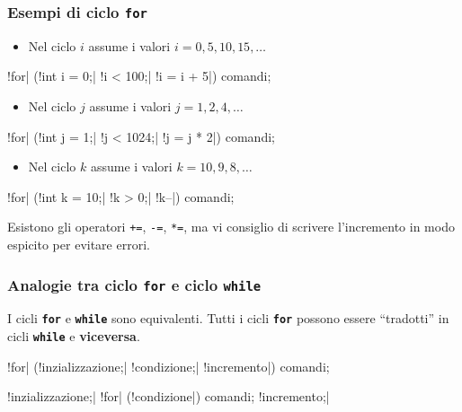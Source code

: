\begin{frame}[fragile]\frametitle{Esempi di ciclo \texttt{for}}

  \begin{itemize} 
    \item Nel ciclo $i$ assume i valori $i = 0, 5, 10, 15, \dots$
  \end{itemize}
  \begin{JavaCodePlain}[commandchars=\\!|]
    \Word!for| (\Blue!int i = 0;| \Green!i < 100;| \Violet!i = i + 5|) {
      comandi;
    }
  \end{JavaCodePlain}

  \begin{itemize} 
    \item Nel ciclo $j$ assume i valori $j = 1, 2, 4, \dots$
  \end{itemize}  
  \begin{JavaCodePlain}[commandchars=\\!|]
    \Word!for| (\Blue!int j = 1;| \Green!j < 1024;| \Violet!j = j * 2|) {
      comandi;
    }
  \end{JavaCodePlain}
  
  \begin{itemize} 
    \item Nel ciclo $k$ assume i valori $k = 10, 9, 8, \dots$
  \end{itemize}    
  \begin{JavaCodePlain}[commandchars=\\!|]
    \Word!for| (\Blue!int k = 10;| \Green!k > 0;| \Violet!k--|) {
      comandi;
    }
  \end{JavaCodePlain}

  Esistono gli operatori \texttt{+=}, \texttt{-=}, \texttt{*=}, ma vi consiglio di scrivere
  l'incremento in modo espicito per evitare errori.

\end{frame}

\begin{frame}[fragile]\frametitle{Analogie tra ciclo \texttt{for} e ciclo \texttt{while}}

  I cicli \textbf{\texttt{for}} e \textbf{\texttt{while}} sono equivalenti. Tutti i cicli \textbf{\texttt{for}} 
  possono essere ``tradotti'' in cicli \textbf{\texttt{while}} e \textbf{viceversa}.
  
  \begin{JavaCodePlain}[commandchars=\\!|]
    \Word!for| (\Blue!inzializzazione;| \Green!condizione;| \Violet!incremento|) {
      comandi;
    }
  \end{JavaCodePlain}

  \begin{JavaCodePlain}[commandchars=\\!|]
    \Blue!inzializzazione;|
    \Word!for| (\Green!condizione|) {
      comandi;
      \Violet!incremento;|
    }
  \end{JavaCodePlain}
\end{frame}
